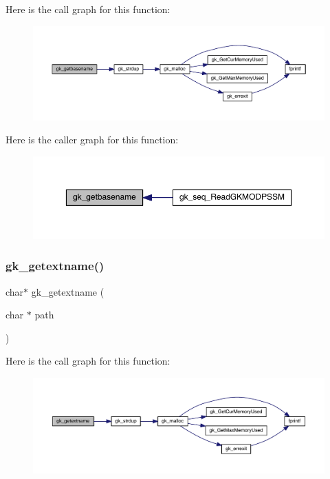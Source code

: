 Here is the call graph for this function\+:\nopagebreak
\begin{figure}[H]
\begin{center}
\leavevmode
\includegraphics[width=350pt]{a00035_ad732cbb6372e1eb9b396792f700091a5_cgraph}
\end{center}
\end{figure}
Here is the caller graph for this function\+:\nopagebreak
\begin{figure}[H]
\begin{center}
\leavevmode
\includegraphics[width=350pt]{a00035_ad732cbb6372e1eb9b396792f700091a5_icgraph}
\end{center}
\end{figure}
\mbox{\label{a00035_a4d728cd9869792eb93b315f949819d99}} 
\subsubsection{\texorpdfstring{gk\+\_\+getextname()}{gk\_getextname()}}
{\footnotesize\ttfamily char$\ast$ gk\+\_\+getextname (\begin{DoxyParamCaption}\item[{char $\ast$}]{path }\end{DoxyParamCaption})}

Here is the call graph for this function\+:\nopagebreak
\begin{figure}[H]
\begin{center}
\leavevmode
\includegraphics[width=350pt]{a00035_a4d728cd9869792eb93b315f949819d99_cgraph}
\end{center}
\end{figure}
\mbox{\label{a00035_a742e52c08aa7e46acd66cde95045d935}} 
